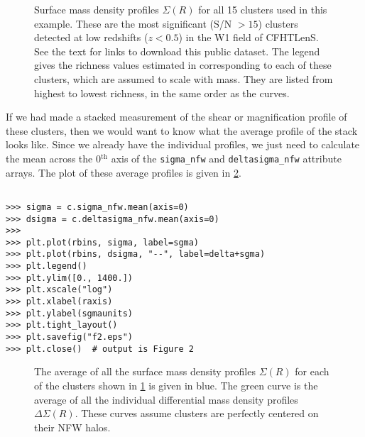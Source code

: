 \documentclass[twocolumn]{aastex6}
\newcommand{\code}{\lstinline[style=codeintext]}
\begin{document}
\begin{figure}
\caption{Surface mass density profiles $\Sigma(R)$ for all 15 clusters used in this example. These are the most significant (S/N $>15$) clusters detected at low redshifts ($z < 0.5$) in the W1 field of CFHTLenS. See the text for links to download this public dataset. The legend gives the richness values estimated in \citet{Ford15} corresponding to each of these clusters, which are assumed to scale with mass. They are listed from highest to lowest richness, in the same order as the curves.}
\label{f1}
\end{figure}

If we had made a stacked measurement of the shear or magnification profile of these clusters, then we would want to know what the average profile of the stack looks like. Since we already have the individual profiles, we just need to calculate the mean across the 0$^\mathrm{th}$ axis of the \code{sigma_nfw} and \code{deltasigma_nfw} attribute arrays. The plot of these average profiles is given in \cref{f2}.

\begin{verbatim}

>>> sigma = c.sigma_nfw.mean(axis=0)
>>> dsigma = c.deltasigma_nfw.mean(axis=0)
>>> 
>>> plt.plot(rbins, sigma, label=sgma)
>>> plt.plot(rbins, dsigma, "--", label=delta+sgma)
>>> plt.legend()
>>> plt.ylim([0., 1400.])
>>> plt.xscale("log")
>>> plt.xlabel(raxis)
>>> plt.ylabel(sgmaunits)
>>> plt.tight_layout()
>>> plt.savefig("f2.eps")
>>> plt.close()  # output is Figure 2

\end{verbatim}

\begin{figure}
\caption{The average of all the surface mass density profiles $\Sigma(R)$ for each of the clusters shown in \cref{f1} is given in blue. The green curve is the average of all the individual differential mass density profiles $\Delta\Sigma(R)$. These curves assume clusters are perfectly centered on their NFW halos.}
\label{f2}
\end{figure}
\end{document}
